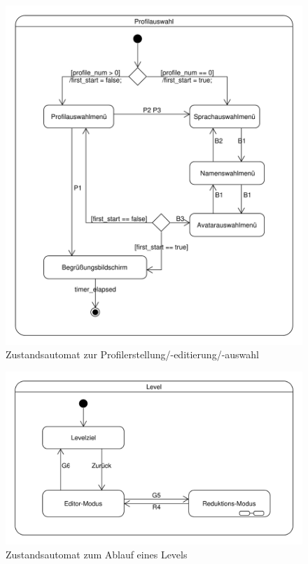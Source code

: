 \begin{figure}[H]
\centering
\includegraphics[scale=0.6]{../system_models/dynamic_models/profile_selection_state_machine.pdf}
\caption{Zustandsautomat zur Profilerstellung/-editierung/-auswahl}
\end{figure}

\begin{figure}[H]
\centering
\includegraphics[scale=0.65]{../system_models/dynamic_models/game_level_state_machine.pdf}
\caption{Zustandsautomat zum Ablauf eines Levels}
\end{figure}

